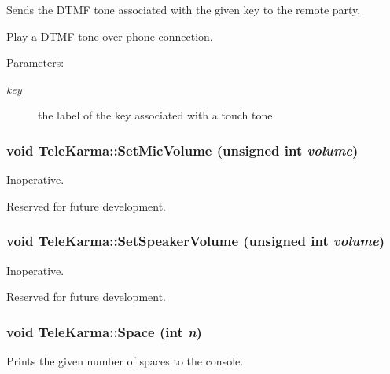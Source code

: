 Sends the DTMF tone associated with the given key to the remote party. 

Play a DTMF tone over phone connection.

\begin{Desc}
\item[Parameters:]
\begin{description}
\item[{\em key}]the label of the key associated with a touch tone\end{description}
\end{Desc}
\hypertarget{classTeleKarma_ecc8d8bd546be13afb320151a0c5014b}{
\subsubsection[{SetMicVolume}]{\setlength{\rightskip}{0pt plus 5cm}void TeleKarma::SetMicVolume (unsigned int {\em volume})}}
\label{classTeleKarma_ecc8d8bd546be13afb320151a0c5014b}


Inoperative. 

Reserved for future development. \hypertarget{classTeleKarma_3b434ca4effe173e19b9334da432a79f}{
\subsubsection[{SetSpeakerVolume}]{\setlength{\rightskip}{0pt plus 5cm}void TeleKarma::SetSpeakerVolume (unsigned int {\em volume})}}
\label{classTeleKarma_3b434ca4effe173e19b9334da432a79f}


Inoperative. 

Reserved for future development. \hypertarget{classTeleKarma_523695bc8f4ab8c3f6cb950c53efc026}{
\subsubsection[{Space}]{\setlength{\rightskip}{0pt plus 5cm}void TeleKarma::Space (int {\em n})}}
\label{classTeleKarma_523695bc8f4ab8c3f6cb950c53efc026}


Prints the given number of spaces to the console. 

